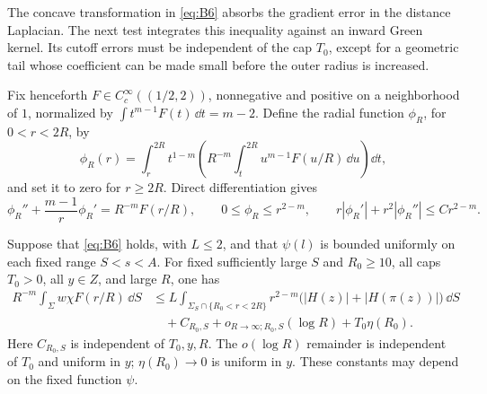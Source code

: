 The concave transformation in \eqref{eq:B6} absorbs the gradient error
in the distance Laplacian.  The next test integrates this inequality
against an inward Green kernel.  Its cutoff errors must be independent
of the cap \(T_0\), except for a geometric tail whose coefficient can
be made small before the outer radius is increased.

Fix henceforth \(F\in C_c^\infty((1/2,2))\), nonnegative and positive
on a neighborhood of \(1\), normalized by
\(\int t^{m-1}F(t)\,\dd t=m-2\).
Define the radial function \(\phi_R\), for \(0<r<2R\), by
\[
 \phi_R(r)=\int_r^{2R}t^{1-m}
       \left(R^{-m}\int_t^{2R}u^{m-1}F(u/R)\,\dd u\right)\dd t,
\]
and set it to zero for \(r\ge2R\).  Direct differentiation gives
\[
 \phi_R''+\frac{m-1}{r}\phi_R'=R^{-m}F(r/R),\qquad
 0\le\phi_R\le r^{2-m},\qquad
 r|\phi_R'|+r^2|\phi_R''|\le Cr^{2-m}.
\]

\begin{lemma}
\label{lem:finite-green}
Suppose that \eqref{eq:B6} holds, with \(L\le2\), and that
\(\psi(l)\) is bounded uniformly on each fixed range \(S<s<A\).
For fixed sufficiently large \(S\) and \(R_0\ge10\), all caps \(T_0>0\),
all \(y\in Z\), and large \(R\), one has
\begin{equation}\label{eq:B7}
 \begin{split}
 R^{-m}\int_\Sigma w\chi F(r/R)\,\dd S
 &\le L\int_{\Sigma_S\cap\{R_0<r<2R\}}
       r^{2-m}\bigl(|H(z)|+|H(\pi(z))|\bigr)\,\dd S\\
 &\quad+C_{R_0,S}+o_{R\to\infty;R_0,S}(\log R)
       +T_0\eta(R_0).
 \end{split}
\end{equation}
Here \(C_{R_0,S}\) is independent of \(T_0,y,R\). The
\(o(\log R)\) remainder is independent of \(T_0\) and uniform in \(y\);
\(\eta(R_0)\to0\) is uniform in \(y\).
These constants may depend on the fixed function \(\psi\).
\end{lemma}

